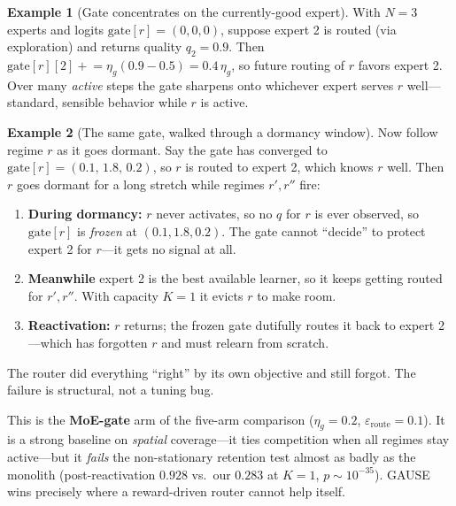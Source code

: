 \documentclass[11pt,a4paper]{article}
\theoremstyle{definition}
\newtheorem{example}{Example}[section]
\theoremstyle{plain}
\begin{document}
\begin{example}[Gate concentrates on the currently-good expert]
With $N = 3$ experts and logits $\mathrm{gate}[r] = (0,0,0)$, suppose expert 2 is
routed (via exploration) and returns quality $q_2 = 0.9$. Then
$\mathrm{gate}[r][2] \mathrel{+}= \eta_g(0.9 - 0.5) = 0.4\,\eta_g$, so future
routing of $r$ favors expert 2. Over many \emph{active} steps the gate sharpens
onto whichever expert serves $r$ well---standard, sensible behavior while $r$ is
active.
\end{example}

\begin{example}[The same gate, walked through a dormancy window]
Now follow regime $r$ as it goes dormant. Say the gate has converged to
$\mathrm{gate}[r] = (0.1,\, 1.8,\, 0.2)$, so $r$ is routed to expert 2, which knows
$r$ well. Then $r$ goes dormant for a long stretch while regimes $r', r''$ fire:
\begin{enumerate}
    \item \textbf{During dormancy:} $r$ never activates, so no $q$ for $r$ is ever
    observed, so $\mathrm{gate}[r]$ is \emph{frozen} at $(0.1, 1.8, 0.2)$. The gate
    cannot ``decide'' to protect expert 2 for $r$---it gets no signal at all.
    \item \textbf{Meanwhile} expert 2 is the best available learner, so it keeps
    getting routed for $r', r''$. With capacity $K{=}1$ it evicts $r$ to make room.
    \item \textbf{Reactivation:} $r$ returns; the frozen gate dutifully routes it
    back to expert 2---which has forgotten $r$ and must relearn from scratch.
\end{enumerate}
The router did everything ``right'' by its own objective and still forgot. The
failure is structural, not a tuning bug.
\end{example}

\begin{keypoint}[title={In GAUSE}]
This is the \textbf{MoE-gate} arm of the five-arm comparison ($\eta_g = 0.2$,
$\varepsilon_{\text{route}} = 0.1$). It is a strong baseline on \emph{spatial}
coverage---it ties competition when all regimes stay active---but it
\emph{fails} the non-stationary retention test almost as badly as the monolith
(post-reactivation $0.928$ vs.\ our $0.283$ at $K{=}1$, $p \sim 10^{-35}$). GAUSE
wins precisely where a reward-driven router cannot help itself.
\end{keypoint}
\end{document}
